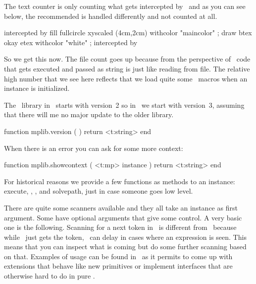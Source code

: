 The text counter is only counting what gets intercepted by \METAPOST\ and as you
can see below, the recommended  is handled differently and not
counted at all.

\startlinecorrection
{} {intercepted by \CONTEXT}
  {\startMPcode
      fill fullcircle xyscaled (4cm,2cm) withcolor "maincolor" ;
      draw btex okay etex withcolor "white" ;
   \stopMPcode} {intercepted by \METAPOST}
\stopcombination
\stoplinecorrection

So we get this now. The file count goes up because from the perspective of
\METAPOST\ code that gets executed and passed as string is just like reading from
file. The relative high number that we see here reflects that we load quite some
\METAFUN\ macros when an instance is initialized.

\startthreerows
\stopthreerows

\stopsection

\startsection[title=Information]

The \METAPOST\ library in \LUATEX\ starts with version~2 so in \LUAMETATEX\ we
start with version~3, assuming that there will me no major update to the older
library.

\starttyping[option=LUA]
function mplib.version ( )
    return <t:string>
end
\stoptyping

When there is an error you can ask for some more context:

\starttyping[option=LUA]
function mplib.showcontext ( <t:mp> instance )
    return <t:string>
end
\stoptyping

\stopsection

\startsection[title=Methods]

For historical reasons we provide a few functions as methods to an instance: \typ
{execute}, , ,  and \typ
{solvepath}, just in case someone goes low level.

\stopsection

\startsection[title=Scanners]

There are quite some scanners available and they all take an instance as first
argument. Some have optional arguments that give some control. A very basic one
is the following. Scanning for a next token in \METAPOST\ is different from \TEX\
because while \TEX\ just gets the token, \METAPOST\ can delay in cases where an
expression is seen. This means that you can inspect what is coming but do some
further scanning based on that. Examples of usage can be found in \CONTEXT\ as it
permits to come up with extensions that behave like new primitives or implement
interfaces that are otherwise hard to do in pure \METAPOST.

